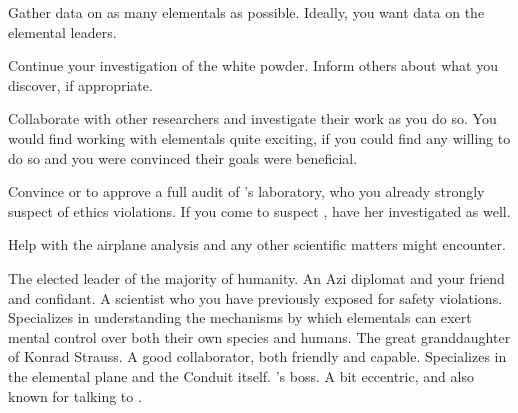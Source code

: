 \documentclass[char]{elementals}
\begin{document}
\begin{itemz}[Goals]
  \item Gather data on as many elementals as possible. Ideally, you want data on the elemental leaders.
  \item Continue your investigation of the white powder. Inform others about what you discover, if appropriate.
  \item Collaborate with other researchers and investigate their work as you do so. You would find working with elementals quite exciting, if you could find any willing to do so and you were convinced their goals were beneficial.
  \item Convince \cLeader{} or \cDema{} to approve a full audit of \cMS{}'s laboratory, who you already strongly suspect of ethics violations. If you come to suspect \cGD{}, have her investigated as well.
  \item Help \cDiplomat{} with the airplane analysis and any other scientific matters \cDiplomat{\they} might encounter.
\end{itemz}

\begin{contacts}
  \contact{\cLeader{}} The elected leader of the majority of humanity.
	\contact{\cDiplomat{}} An Azi diplomat and your friend and confidant.
	\contact{\cMS{}} A scientist who you have previously exposed for safety violations. Specializes in understanding the mechanisms by which elementals can exert mental control over both their own species and humans.
	\contact{\cGD{}} The great granddaughter of Konrad Strauss. A good collaborator, both friendly and capable. Specializes in the elemental plane and the Conduit itself.
  \contact{\cAvatar{}} \cDiplomat{}'s boss. A bit eccentric, and also known for talking to \cAvatar{\themself}.
\end{contacts}
\end{document}
